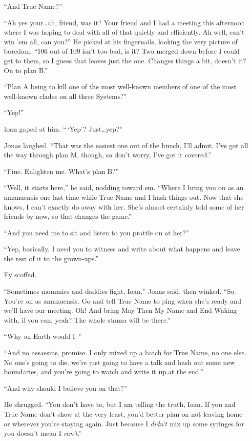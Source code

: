 ``And True Name?''

``Ah yes your\ldots ah, friend, was it? Your friend and I had a meeting this afternoon where I was hoping to deal with all of that quietly and efficiently. Ah well, can't win 'em all, can you?'' He picked at his fingernails, looking the very picture of boredom. ``106 out of 109 isn't too bad, is it? Two merged down before I could get to them, so I guess that leaves just the one. Changes things a bit, doesn't it? On to plan B.''

``Plan A being to kill one of the most well-known members of one of the most well-known clades on all three Systems?''

``Yep!''

Ioan gaped at him. ``\,`Yep'? Just\ldots yep?''

Jonas laughed. ``That was the easiest one out of the bunch, I'll admit. I've got all the way through plan M, though, so don't worry, I've got it covered.''

``Fine. Enlighten me. What's plan B?''

``Well, it starts here,'' he said, nodding toward em. ``Where I bring you on as an amanuensis one last time while True Name and I hash things out. Now that she knows, I can't exactly do away with her. She's almost certainly told some of her friends by now, so that changes the game.''

``And you need me to sit and listen to you prattle on at her?''

``Yep, basically. I need you to witness and write about what happens and leave the rest of it to the grown-ups.''

Ey scoffed.

``Sometimes mommies and daddies fight, Ioan,'' Jonas said, then winked. ``So. You're on as amanuensis. Go and tell True Name to ping when she's ready and we'll have our meeting. Oh! And bring May Then My Name and End Waking with, if you can, yeah? The whole stanza will be there.''

``Why on Earth would I--''

``And no assassins, promise. I only mixed up a batch for True Name, no one else. No one's going to die, we're just going to have a talk and hash out some new boundaries, and you're going to watch and write it up at the end.''

``And why should I believe you on that?''

He shrugged. ``You don't have to, but I am telling the truth, Ioan. If you and True Name don't show at the very least, you'd better plan on not leaving home or wherever you're staying again. Just because I \emph{didn't} mix up some syringes for you doesn't mean I \emph{can't}.''

